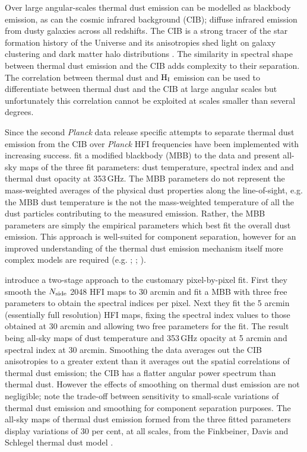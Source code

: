 \documentclass[a4paper,fleqn,usenatbib]{mnras}
\begin{document}
Over large angular-scales thermal dust emission can be modelled as blackbody emission, as can the cosmic infrared background (CIB); diffuse infrared emission from dusty galaxies across all redshifts. The CIB is a strong tracer of the star formation history of the Universe \citep{lagache} and its anisotropies shed light on galaxy clustering and dark matter halo distributions \citep{bethermin}. The similarity in spectral shape between thermal dust emission and the CIB adds complexity to their separation. The correlation between thermal dust and $\rm{H_{I}}$ emission can be used to differentiate between thermal dust and the CIB at large angular scales \citep{pr2} but unfortunately this correlation cannot be exploited at scales smaller than several degrees. 

Since the second {\it{Planck}} data release specific attempts to separate thermal dust emission from the CIB over {\it{Planck}} HFI frequencies have been implemented with increasing success. \citet{pr2} fit a modified blackbody (MBB) to the data and present all-sky maps of the three fit parameters: dust temperature, spectral index and and thermal dust opacity at 353\,GHz. The MBB parameters do not represent the mass-weighted averages of the physical dust properties along the line-of-sight, e.g. the MBB dust temperature is the not the mass-weighted temperature of all the dust particles contributing to the measured emission. Rather, the MBB parameters are simply the empirical parameters which best fit the overall dust emission. This approach is well-suited for component separation, however for an improved understanding of the thermal dust emission mechanism itself more complex models are required (e.g. \citet{draine}; \citet{comp11}; \citet{jones}).

\citet{pr2} introduce a two-stage approach to the customary pixel-by-pixel fit. First they smooth the $N_{\rm{side}}$ 2048 HFI maps to 30 arcmin and fit a MBB with three free parameters to obtain the spectral indices per pixel. Next they fit the 5 arcmin (essentially full resolution) HFI maps, fixing the spectral index values to those obtained at 30 arcmin and allowing two free parameters for the fit. The result being all-sky maps of dust temperature and 353\,GHz opacity at 5 arcmin and spectral index at 30 arcmin. Smoothing the data averages out the CIB anisotropies to a greater extent than it averages out the spatial correlations of thermal dust emission; the CIB has a flatter angular power spectrum than thermal dust. However the effects of smoothing on thermal dust emission are not negligible; \citet{pr2} note the trade-off between sensitivity to small-scale variations of thermal dust emission and smoothing for component separation purposes. The all-sky maps of thermal dust emission formed from the three fitted parameters display variations of 30 per cent, at all scales, from the Finkbeiner, Davis and Schlegel thermal dust model \citep{fds}. 
\end{document}
